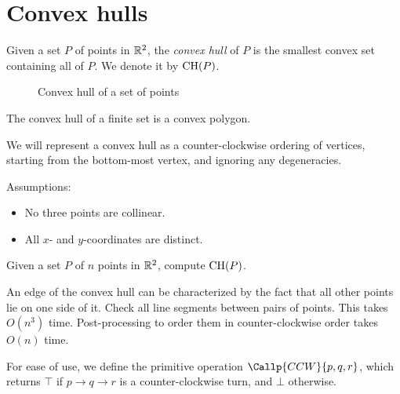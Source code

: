 \chapter{Convex hulls} \label{chp:hull}

\begin{definition} \label{def:hull}
    Given a set $P$ of points in $\mathbb{R}^2$, the \emph{convex hull} of $P$
    is the smallest convex set containing all of $P$.
    We denote it by $\operatorname{CH}(P)$.
\end{definition}
\begin{figure}
    \centering
    \caption{Convex hull of a set of points}
    \label{fig:hull}
\end{figure}

\begin{theorem} \label{thm:hull}
    The convex hull of a finite set is a convex polygon.
\end{theorem}

We will represent a convex hull as a counter-clockwise ordering of vertices,
starting from the bottom-most vertex, and ignoring any degeneracies.

Assumptions:
\begin{itemize}
    \item No three points are collinear.
    \item All $x$- and $y$-coordinates are distinct.
\end{itemize}

\begin{question*}
    Given a set $P$ of $n$ points in $\mathbb{R}^2$, compute $\operatorname{CH}(P)$.
\end{question*}
\begin{solution}[Naivest]
    An edge of the convex hull can be characterized by the fact that all
    other points lie on one side of it.
    Check all line segments between pairs of points.
    This takes $O(n^3)$ time.
    Post-processing to order them in counter-clockwise order takes
    $O(n)$ time.
\end{solution}
For ease of use, we define the primitive operation
$\Callp{CCW}{p, q, r}$, which returns $\top$ if
$p \to q \to r$ is a counter-clockwise turn, and $\bot$ otherwise.

